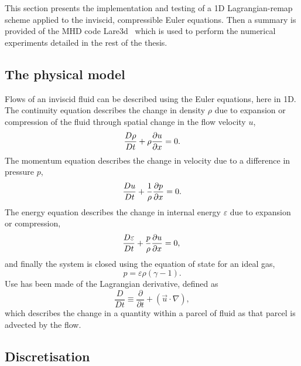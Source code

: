 This section presents the implementation and testing of a 1D Lagrangian-remap scheme applied to the inviscid, compressible Euler equations. Then a summary is provided of the MHD code Lare3d~\cite{arberStaggeredGridLagrangian2001} which is used to perform the numerical experiments detailed in the rest of the thesis. 

\subsection{The physical model}

Flows of an inviscid fluid can be described using the Euler equations, here in 1D. The continuity equation describes the change in density $\rho$ due to expansion or compression of the fluid through spatial change in the flow velocity $u$,
\begin{equation}
  \frac{D \rho}{Dt} + \rho\frac{\partial u}{\partial x} = 0.\\
  \label{eqn-Lare1d-density}
\end{equation}
The momentum equation describes the change in velocity due to a difference in pressure $p$,
\begin{equation}
  \frac{D u}{Dt} + \frac{1}{\rho}\frac{\partial p}{\partial x} = 0.\\
  \label{eqn-Lare1d-velocity}
\end{equation}
The energy equation describes the change in internal energy $\varepsilon$ due to expansion or compression,
\begin{equation}
  \frac{D \varepsilon}{Dt} + \frac{p}{\rho}\frac{\partial u}{\partial x} = 0,\\
  \label{eqn-Lare1d-energy}
\end{equation}
and finally the system is closed using the equation of state for an ideal gas,
\begin{equation}
  p = \varepsilon\rho(\gamma - 1).
  \label{eqn-Lare1d-equation-of-state}
\end{equation}
Use has been made of the Lagrangian derivative, defined as
\begin{equation}
  \frac{D }{Dt} \equiv \frac{\partial}{\partial t} + (\vec{u} \cdot \nabla),
\end{equation}
which describes the change in a quantity within a parcel of fluid as that parcel is advected by the flow. 

\subsection{Discretisation} 

